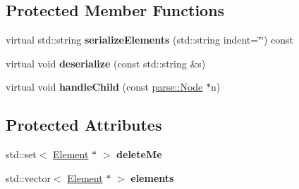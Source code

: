\subsection*{Protected Member Functions}
\begin{DoxyCompactItemize}
\item 
\hypertarget{classg2c_1_1_model_a4992a4fc88bb1595e1ad85ea9a31a7bd}{
virtual std::string {\bfseries serializeElements} (std::string indent=\char`\"{}\char`\"{}) const }
\label{classg2c_1_1_model_a4992a4fc88bb1595e1ad85ea9a31a7bd}

\item 
\hypertarget{classg2c_1_1_model_ae527cab9ea535e4cae434afd25cd80e6}{
virtual void {\bfseries deserialize} (const std::string \&s)}
\label{classg2c_1_1_model_ae527cab9ea535e4cae434afd25cd80e6}

\item 
\hypertarget{classg2c_1_1_model_ae3ff150b2ff56b6e6413972524a20dee}{
virtual void {\bfseries handleChild} (const \hyperlink{classparse_1_1_node}{parse::Node} $\ast$n)}
\label{classg2c_1_1_model_ae3ff150b2ff56b6e6413972524a20dee}

\end{DoxyCompactItemize}
\subsection*{Protected Attributes}
\begin{DoxyCompactItemize}
\item 
\hypertarget{classg2c_1_1_model_afd27c177f46e2e4ca39d2de58f564ca5}{
std::set$<$ \hyperlink{classg2c_1_1_element}{Element} $\ast$ $>$ {\bfseries deleteMe}}
\label{classg2c_1_1_model_afd27c177f46e2e4ca39d2de58f564ca5}

\item 
\hypertarget{classg2c_1_1_model_a3b9a49e442e7d51057413d82256f0451}{
std::vector$<$ \hyperlink{classg2c_1_1_element}{Element} $\ast$ $>$ {\bfseries elements}}
\label{classg2c_1_1_model_a3b9a49e442e7d51057413d82256f0451}

\end{DoxyCompactItemize}
